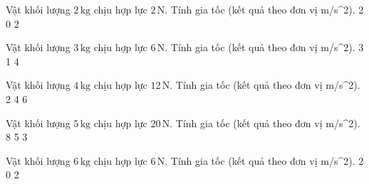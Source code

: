

\begin{ex}
Vật khối lượng $2\,\text{kg}$ chịu hợp lực $2\,\text{N}$. Tính gia tốc (kết quả theo đơn vị m/s^2).
\choice
{}
{2}
{0}
{2}
\end{ex}

\begin{ex}
Vật khối lượng $3\,\text{kg}$ chịu hợp lực $6\,\text{N}$. Tính gia tốc (kết quả theo đơn vị m/s^2).
\choice
{3}
{}
{1}
{4}
\end{ex}

\begin{ex}
Vật khối lượng $4\,\text{kg}$ chịu hợp lực $12\,\text{N}$. Tính gia tốc (kết quả theo đơn vị m/s^2).
\choice
{2}
{4}
{}
{6}
\end{ex}

\begin{ex}
Vật khối lượng $5\,\text{kg}$ chịu hợp lực $20\,\text{N}$. Tính gia tốc (kết quả theo đơn vị m/s^2).
\choice
{8}
{5}
{3}
{}
\end{ex}

\begin{ex}
Vật khối lượng $6\,\text{kg}$ chịu hợp lực $6\,\text{N}$. Tính gia tốc (kết quả theo đơn vị m/s^2).
\choice
{}
{2}
{0}
{2}
\end{ex}

